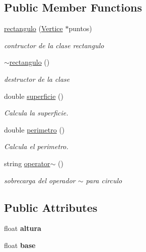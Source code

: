 \subsection*{Public Member Functions}
\begin{DoxyCompactItemize}
\item 
\hyperlink{classrectangulo_aa785cc2d5bd4cbae7dab1912afba62a7}{rectangulo} (\hyperlink{class_vertice}{Vertice} $\ast$puntos)
\begin{DoxyCompactList}\small\item\em contructor de la clase rectangulo \end{DoxyCompactList}\item 
\mbox{\label{classrectangulo_aba192e636fe037aaf0ccc294e4570b29}} 
\hyperlink{classrectangulo_aba192e636fe037aaf0ccc294e4570b29}{$\sim$rectangulo} ()
\begin{DoxyCompactList}\small\item\em destructor de la clase \end{DoxyCompactList}\item 
\mbox{\label{classrectangulo_ab0db7c753485200cf2577532af506426}} 
double \hyperlink{classrectangulo_ab0db7c753485200cf2577532af506426}{superficie} ()
\begin{DoxyCompactList}\small\item\em Calcula la superficie. \end{DoxyCompactList}\item 
\mbox{\label{classrectangulo_a23a8d0d8a593f80776b4629c6dc435e0}} 
double \hyperlink{classrectangulo_a23a8d0d8a593f80776b4629c6dc435e0}{perimetro} ()
\begin{DoxyCompactList}\small\item\em Calcula el perimetro. \end{DoxyCompactList}\item 
\mbox{\label{classrectangulo_a72992eaf78fb4834cbe2774604a70a0d}} 
string \hyperlink{classrectangulo_a72992eaf78fb4834cbe2774604a70a0d}{operator$\sim$} ()
\begin{DoxyCompactList}\small\item\em sobrecarga del operador $\sim$ para circulo \end{DoxyCompactList}\end{DoxyCompactItemize}
\subsection*{Public Attributes}
\begin{DoxyCompactItemize}
\item 
\mbox{\label{classrectangulo_a4793bfe1636488ed8344a82a271dcd8d}} 
float {\bfseries altura}
\item 
\mbox{\label{classrectangulo_a0f5bab44f86d9b58bd1c4710f3e001b5}} 
float {\bfseries base}
\end{DoxyCompactItemize}
